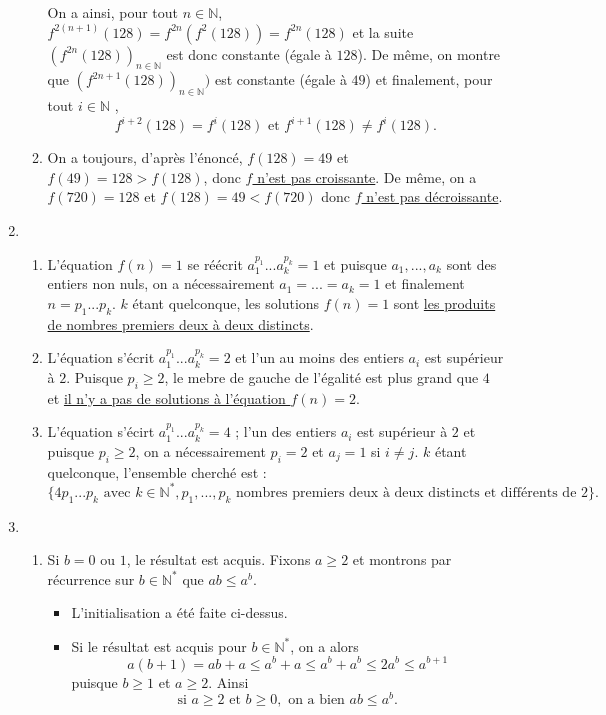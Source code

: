 \documentclass[10pt,a4paper]{article}
\begin{document}
\begin{enumerate}
\begin{enumerate}
On a ainsi, pour tout $n\in\mathbb{N}$, $f^{2(n+1)}(128)=f^{2n}(f^2(128))=f^{2n}(128)$ et la suite $(f^{2n}(128))_{n\in\mathbb{N}}$ est donc constante (égale à $128$).
De même, on montre que $(f^{2n+1}(128))_{n\in\mathbb{N}})$ est constante (égale à $49$) et finalement, pour tout $i\in\mathbb{N}$ ,
$$ \boxed{f^{i+2}(128)=f^i(128) \text{ et } f^{i+1}(128)\neq f^i(128).}$$ 
\item On a toujours, d'après l'énoncé, $f(128)=49$ et $f(49)=128 > f(128)$, donc \underline{$f$ n'est pas croissante}. De même, on a $f(720)=128$ et 
$f(128)=49 < f(720)$ donc \underline{ $f$ n'est pas décroissante}.
\end{enumerate}
\item 
\begin{enumerate}
\item L'équation $f(n)=1$ se réécrit $a_1^{p_1}...a_k^{p_k}=1$ et puisque $a_1, ..., a_k$ sont des entiers non nuls, on a nécessairement $a_1=...=a_k=1$ et 
finalement $n=p_1...p_k$. $k$ étant quelconque, les solutions $f(n)=1$ sont \underline{les produits de nombres premiers deux à deux distincts}.
\item L'équation s'écrit $a_1^{p_1}...a_k^{p_k}=2$ et l'un au moins des entiers $a_i$ est supérieur à $2$. Puisque $p_i\geqslant 2$, le mebre de gauche de 
l'égalité est plus grand que $4$ et \underline{il n'y a pas de solutions à l'équation $f(n)=2$}.
\item L'équation s'écirt $a_1^{p_1}...a_k^{p_k}=4$ ; l'un des entiers $a_i$ est supérieur à $2$ et puisque $p_i\geqslant 2$, on a nécessairement $p_i=2$ et 
$a_j=1$ si $i\neq j$. $k$ étant quelconque, l'ensemble cherché est :
$$\boxed{\{4p_1...p_k\text{ avec }k\in\mathbb{N}^*, p_1,..., p_k \text{ nombres premiers deux à deux distincts et différents de } 2\}.}$$
\end{enumerate}
\item
\begin{enumerate}
\item Si $b=0$ ou $1$, le résultat est acquis. Fixons $a\geqslant 2$ et montrons par récurrence sur $b\in\mathbb{N}^*$ que $ab\leqslant a^b$.
\begin{itemize}
\item L'initialisation a été faite ci-dessus.
\item Si le résultat est acquis pour $b\in\mathbb{N}^*$, on a alors 
$$a(b+1)=ab +a\leqslant a^b +a \leqslant a^b+a^b \leqslant 2a^b \leqslant a^{b+1}$$
puisque $b\geqslant 1$ et $a\geqslant 2$. Ainsi
$$\boxed{ \text{si } a\geqslant 2 \text{ et } b\geqslant 0, \text{  on a bien } ab\leqslant a^b.}$$

\end{itemize}
\end{enumerate}
\end{enumerate}
\end{document}
